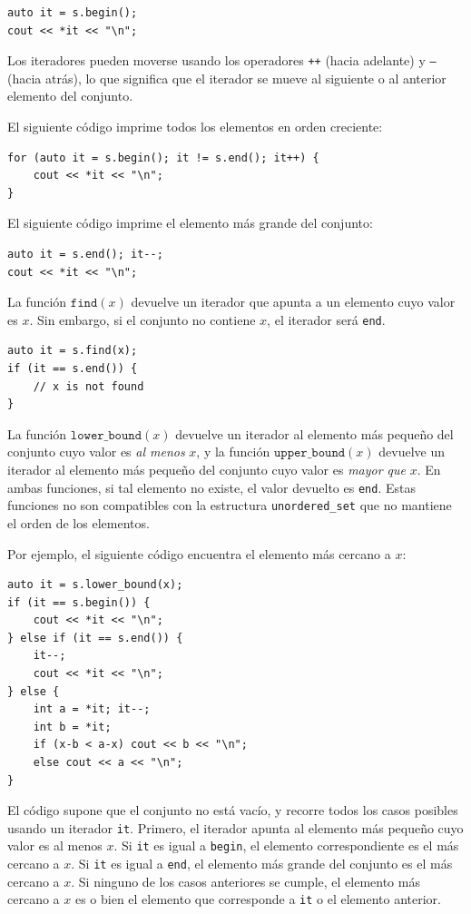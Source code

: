 \begin{lstlisting}
auto it = s.begin();
cout << *it << "\n";
\end{lstlisting}

Los iteradores pueden moverse usando los operadores
\texttt{++} (hacia adelante) y \texttt{--} (hacia atrás),
lo que significa que el iterador se mueve al siguiente
o al anterior elemento del conjunto.

El siguiente código imprime todos los elementos
en orden creciente:
\begin{lstlisting}
for (auto it = s.begin(); it != s.end(); it++) {
    cout << *it << "\n";
}
\end{lstlisting}
El siguiente código imprime el elemento más grande del conjunto:
\begin{lstlisting}
auto it = s.end(); it--;
cout << *it << "\n";
\end{lstlisting}

La función $\texttt{find}(x)$ devuelve un iterador
que apunta a un elemento cuyo valor es $x$.
Sin embargo, si el conjunto no contiene $x$,
el iterador será \texttt{end}.

\begin{lstlisting}
auto it = s.find(x);
if (it == s.end()) {
    // x is not found
}
\end{lstlisting}

La función $\texttt{lower\_bound}(x)$ devuelve
un iterador al elemento más pequeño del conjunto
cuyo valor es \emph{al menos} $x$, y
la función $\texttt{upper\_bound}(x)$
devuelve un iterador al elemento más pequeño del conjunto
cuyo valor es \emph{mayor que} $x$.
En ambas funciones, si tal elemento no existe,
el valor devuelto es \texttt{end}.
Estas funciones no son compatibles con la
estructura \texttt{unordered\_set} que
no mantiene el orden de los elementos.

\begin{samepage}
Por ejemplo, el siguiente código encuentra el elemento
más cercano a $x$:

\begin{lstlisting}
auto it = s.lower_bound(x);
if (it == s.begin()) {
    cout << *it << "\n";
} else if (it == s.end()) {
    it--;
    cout << *it << "\n";
} else {
    int a = *it; it--;
    int b = *it;
    if (x-b < a-x) cout << b << "\n";
    else cout << a << "\n";
}
\end{lstlisting}

El código supone que el conjunto no está vacío,
y recorre todos los casos posibles
usando un iterador \texttt{it}.
Primero, el iterador apunta al elemento más pequeño
cuyo valor es al menos $x$.
Si \texttt{it} es igual a \texttt{begin},
el elemento correspondiente es el más cercano a $x$.
Si \texttt{it} es igual a \texttt{end},
el elemento más grande del conjunto es el más cercano a $x$.
Si ninguno de los casos anteriores se cumple,
el elemento más cercano a $x$ es o bien el
elemento que corresponde a \texttt{it} o el elemento anterior.
\end{samepage}


